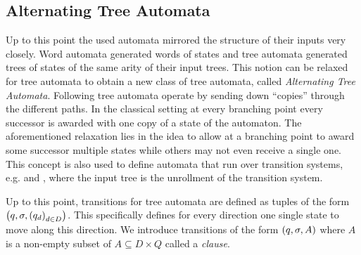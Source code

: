 \subsection{Alternating Tree Automata}
\label{subsec:ata}
Up to this point the used automata mirrored the structure of their inputs
very closely. Word automata generated words of states and tree automata 
generated trees of states of the same arity of their input trees. This notion 
can be relaxed for tree automata to obtain a new class of tree
automata, called \emph{Alternating Tree Automata}. Following 
\cite{AltTreeAuto} tree automata operate by sending down \enquote{copies} 
through the different paths. In the classical setting at every branching point 
every successor is awarded with one copy of a state of the automaton. The 
aforementioned relaxation lies in the idea to allow at a branching point to 
award some successor multiple states while others may not even receive 
a single one. This concept is also used to define automata that run over 
transition systems, e.g. \cite[Chapter 9]{AutoLogInfGames} and 
\cite{SynProbEnv}, where the input tree is the unrollment of the transition 
system.

Up to this point, transitions for tree automata are defined as tuples of the 
form $\left(q, \sigma, \left(q_{d}\right)_{d\in D}\right)$. This specifically defines for
every direction one single state to move along this direction. We introduce
transitions of the form $\left(q,\sigma,A\right)$ where $A$ is a non-empty subset of 
$A\subseteq D\times Q$ called a \emph{clause}.

